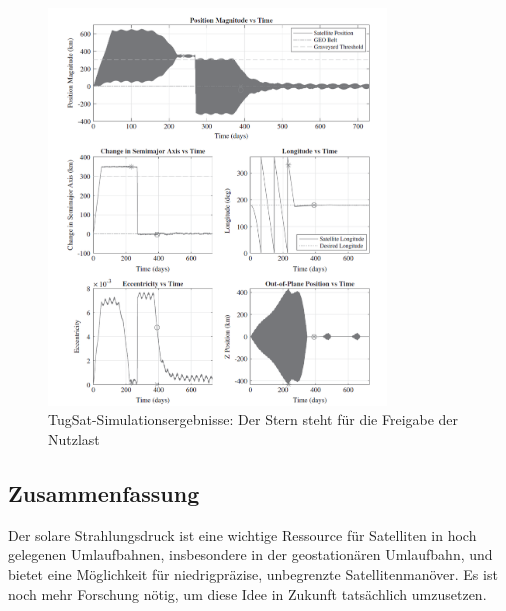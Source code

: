 \begin{figure}[htbp]
	\centering
	\includegraphics[width=0.8\textwidth]{bilder/Simulation_TugSat.png}
	\caption{TugSat-Simulationsergebnisse: Der Stern steht für die Freigabe der Nutzlast}
	\label{Simulation_TugSat}
\end{figure}

\subsection{Zusammenfassung}
Der solare Strahlungsdruck ist eine wichtige Ressource für Satelliten in hoch gelegenen Umlaufbahnen, insbesondere in der geostationären Umlaufbahn, und bietet eine Möglichkeit für niedrigpräzise, unbegrenzte Satellitenmanöver. Es ist noch mehr Forschung nötig, um diese Idee in Zukunft tatsächlich umzusetzen.

